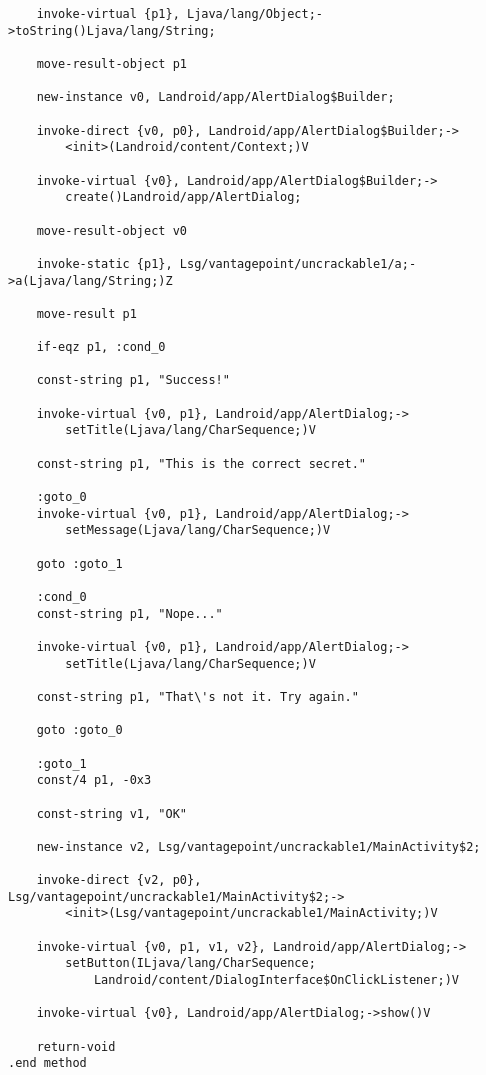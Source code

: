 \begin{verbatim}
    invoke-virtual {p1}, Ljava/lang/Object;->toString()Ljava/lang/String;

    move-result-object p1

    new-instance v0, Landroid/app/AlertDialog$Builder;

    invoke-direct {v0, p0}, Landroid/app/AlertDialog$Builder;->
        <init>(Landroid/content/Context;)V

    invoke-virtual {v0}, Landroid/app/AlertDialog$Builder;->
        create()Landroid/app/AlertDialog;

    move-result-object v0

    invoke-static {p1}, Lsg/vantagepoint/uncrackable1/a;->a(Ljava/lang/String;)Z

    move-result p1

    if-eqz p1, :cond_0

    const-string p1, "Success!"

    invoke-virtual {v0, p1}, Landroid/app/AlertDialog;->
        setTitle(Ljava/lang/CharSequence;)V

    const-string p1, "This is the correct secret."

    :goto_0
    invoke-virtual {v0, p1}, Landroid/app/AlertDialog;->
        setMessage(Ljava/lang/CharSequence;)V

    goto :goto_1

    :cond_0
    const-string p1, "Nope..."

    invoke-virtual {v0, p1}, Landroid/app/AlertDialog;->
        setTitle(Ljava/lang/CharSequence;)V

    const-string p1, "That\'s not it. Try again."

    goto :goto_0

    :goto_1
    const/4 p1, -0x3

    const-string v1, "OK"

    new-instance v2, Lsg/vantagepoint/uncrackable1/MainActivity$2;

    invoke-direct {v2, p0}, Lsg/vantagepoint/uncrackable1/MainActivity$2;->
        <init>(Lsg/vantagepoint/uncrackable1/MainActivity;)V

    invoke-virtual {v0, p1, v1, v2}, Landroid/app/AlertDialog;->
        setButton(ILjava/lang/CharSequence;
            Landroid/content/DialogInterface$OnClickListener;)V

    invoke-virtual {v0}, Landroid/app/AlertDialog;->show()V

    return-void
.end method
\end{verbatim}
